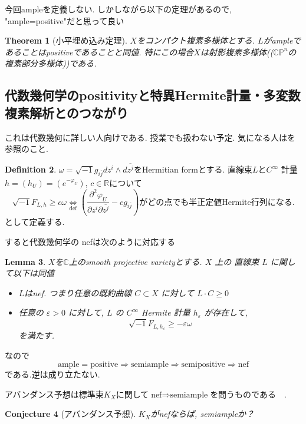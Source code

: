 \documentclass[dvipdfmx,a4paper,11pt]{article} %
\newtheorem{thm}{Theorem}[section]
\newtheorem{conj}[thm]{Conjecture}
\newtheorem{lem}[thm]{Lemma}
\theoremstyle{definition}
\newtheorem{defn}[thm]{Definition}
\theoremstyle{remark}
\numberwithin{equation}{section}
\newcommand{\R}{\mathbb{R}}
\newcommand{\C}{\mathbb{C}}
\begin{document}
今回ampleを定義しない. しかしながら以下の定理があるので, "ample=positive"だと思って良い
\begin{thm}[小平埋め込み定理]
$X$をコンパクト複素多様体とする. 
$L$がampleであることはpositiveであることと同値. 
特にこの場合$X$は射影複素多様体((\(\C\mathbb{P}^n\)の複素部分多様体))である. 
\end{thm}

\subsection{代数幾何学のpositivityと特異Hermite計量・多変数複素解析とのつながり}
\label{subsec-positivity}
これは代数幾何に詳しい人向けである. 授業でも扱わない予定. 
気になる人は\cite[Section 5]{Dem12}を参照のこと. 

 \begin{defn}
 $\omega=\sqrt{-1}g_{i \overline{j}}dz^i \wedge d\overline{z^j}$をHermitian formとする.
  直線束$L$と\(C^\infty\) 計量$h = (h_{U})=(e^{-\varphi_{U}})$, $c \in \R$について
 $$
 \sqrt{-1}F_{L,h} \ge c\omega
 \underset{\text{def}}{\Leftrightarrow}
\left( \frac{\partial^2 \varphi_U }{\partial z^i \partial \overline{z^j}}  - cg_{i \overline{j}}\right)
\text{がどの点でも半正定値Hermite行列になる.}
 $$
 として定義する. 
 \end{defn}

すると代数幾何学の nefは次のように対応する
\begin{lem}
$X$を$\C$上のsmooth projective varietyとする.  \(X\) 上の 直線束 \(L\) に関して以下は同値
\begin{itemize}
\item $L$はnef. つまり任意の既約曲線 \(C\subset X\) に対して
\(
L\cdot C\geq 0
\)
\item  任意の \(\varepsilon>0\) に対して, \(L\) の \(C^\infty\) Hermite 計量 \(h_\varepsilon\) が存在して,
\[
 \sqrt{-1}F_{L,h_\varepsilon}\geq -\varepsilon\omega
\]
を満たす. 
\end{itemize}
\end{lem}
なので
$$
\text{ample}=\text{positive} \Rightarrow
\text{semiample} \Rightarrow
\text{semipositive} \Rightarrow \text{nef} 
$$
である.逆は成り立たない. 

アバンダンス予想は標準束$K_X$に関して$\text{nef} \Rightarrow \text{semiample}  $を問うものである　.
\begin{conj}[アバンダンス予想]
$K_X$がnefならば, semiampleか？
\end{conj}
\end{document}
